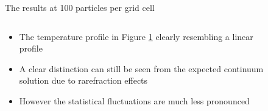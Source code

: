 \documentclass{beamer}
\begin{document}
        \begin{frame}{The results at 100 particles per grid cell}
            \begin{columns}
                \begin{column}{0.5\linewidth}
                    \begin{itemize}
                        \setlength\itemsep{0.25cm}
                                
                        \item<1->The temperature profile in Figure \ref{gra:kn0.1_100ppgc_100g} clearly resembling a linear profile

                        \item<2-> A clear distinction can still be seen from the expected continuum solution due to rarefraction effects

                        \item<3-> However the statistical fluctuations are much less pronounced
                    \end{itemize}                    
                \end{column} 
            
                \begin{column}{0.5\linewidth}
                    \begin{figure}
                        \centering
                        
                        \caption{}
                        \label{gra:kn0.1_100ppgc_100g}
                    \end{figure}
                \end{column}
            \end{columns}
        \end{frame}
\end{document}
